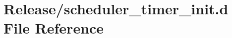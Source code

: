 \hypertarget{scheduler__timer__init_8d}{}\section{Release/scheduler\+\_\+timer\+\_\+init.d File Reference}
\label{scheduler__timer__init_8d}
